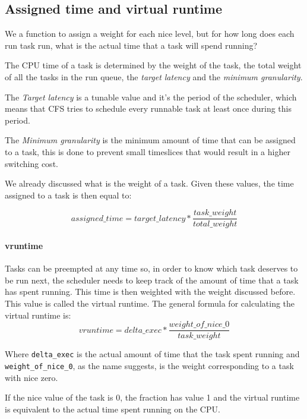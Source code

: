 \documentclass[10pt, oneside]{book}
\begin{document}
\subsection{Assigned time and virtual runtime}

We a function to assign a weight for each nice level, but for how long does each run task run, what is the actual time that a task will spend running?


The CPU time of a task is determined by the weight of the task, the total weight of all the tasks in the run queue, the \textit{target latency} and the \textit{minimum granularity}. 

The \textit{Target latency} is a tunable value and it's the period of the scheduler, which means that CFS tries to schedule every runnable task at least once during this period. 

The \textit{Minimum granularity} is the minimum amount of time that can be assigned to a task, this is done to prevent small timeslices that would result in a higher switching cost.

We already discussed what is the weight of a task. Given these values, the time assigned to a task is then equal to: 

\begin{equation} \label{eq:2.4}
    assigned\_time = target\_latency * \frac{task\_weight}{total\_weight}
\end{equation}

\paragraph{vruntime}

Tasks can be preempted at any time so, in order to know which task deserves to be run next, the scheduler needs to keep track of the amount of time that a task has spent running. This time is then weighted with the weight discussed before. This value is called the virtual runtime. The general formula for calculating the virtual runtime is:
\begin{equation}
    vruntime = delta\_exec * \frac{weight\_of\_nice\_0}{task\_weight}
\end{equation}

Where \verb|delta_exec| is the actual amount of time that the task spent running and \verb|weight_of_nice_0|, as the name suggests, is the weight corresponding to a task with nice zero.

If the nice value of the task is 0, the fraction has value 1 and the virtual runtime is equivalent to the actual time spent running on the CPU.
\end{document}
